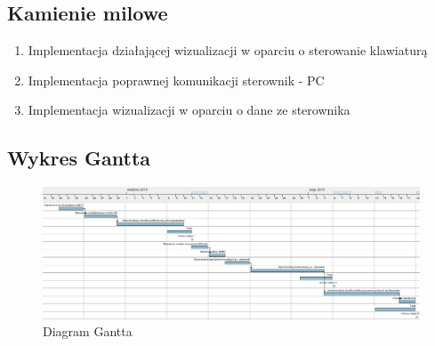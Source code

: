 \documentclass[10pt, a4paper]{article}
\begin{document}
	\subsection{Kamienie milowe}
		\begin{enumerate}
			\item Implementacja działającej wizualizacji w oparciu o sterowanie klawiaturą
			\item Implementacja poprawnej komunikacji sterownik - PC
			\item Implementacja wizualizacji w oparciu o dane ze sterownika
		\end{enumerate}
	
	\subsection{Wykres Gantta}
	
	\begin{figure}[H]
		\centering
		\includegraphics[width=1.4\textwidth, angle = 90]{figures/harm1.png}
		\caption{Diagram Gantta}
		\label{fig:DiagramGantta}
	\end{figure}
\end{document}
